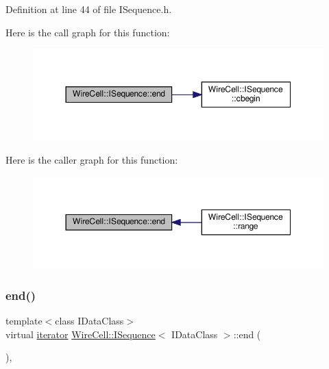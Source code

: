 Definition at line 44 of file I\+Sequence.\+h.

Here is the call graph for this function\+:
\nopagebreak
\begin{figure}[H]
\begin{center}
\leavevmode
\includegraphics[width=350pt]{class_wire_cell_1_1_i_sequence_afc9e30f4829c0b1ac9b8006f6eefd411_cgraph}
\end{center}
\end{figure}
Here is the caller graph for this function\+:
\nopagebreak
\begin{figure}[H]
\begin{center}
\leavevmode
\includegraphics[width=350pt]{class_wire_cell_1_1_i_sequence_afc9e30f4829c0b1ac9b8006f6eefd411_icgraph}
\end{center}
\end{figure}
\mbox{\label{class_wire_cell_1_1_i_sequence_a4aeda2d0a7c1ffd3b1a708c7e983487a}} 
\subsubsection{\texorpdfstring{end()}{end()}\hspace{0.1cm}{\footnotesize\ttfamily [2/2]}}
{\footnotesize\ttfamily template$<$class I\+Data\+Class$>$ \\
virtual \hyperlink{class_wire_cell_1_1_i_sequence_ac9bcf643972944d21c90743d9281f47a}{iterator} \hyperlink{class_wire_cell_1_1_i_sequence}{Wire\+Cell\+::\+I\+Sequence}$<$ I\+Data\+Class $>$\+::end (\begin{DoxyParamCaption}{ }\end{DoxyParamCaption})\hspace{0.3cm}{\ttfamily [inline]}, {\ttfamily [virtual]}}




